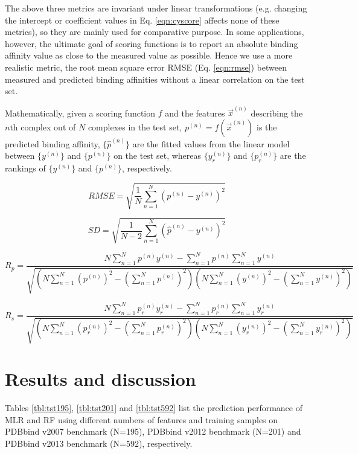 \documentclass[journal=jacsat,manuscript=article]{achemso}
\begin{document}
The above three metrics are invariant under linear transformations (e.g. changing the intercept or coefficient values in Eq. \ref{eqn:cyscore} affects none of these metrics), so they are mainly used for comparative purpose. In some applications, however, the ultimate goal of scoring functions is to report an absolute binding affinity value as close to the measured value as possible. Hence we use a more realistic metric, the root mean square error RMSE (Eq. \ref{eqn:rmse}) between measured and predicted binding affinities without a linear correlation on the test set.

Mathematically, given a scoring function $f$ and the features $\overrightarrow{x}^{(n)}$ describing the $n$th complex out of $N$ complexes in the test set, $p^{(n)}=f(\overrightarrow{x}^{(n)})$ is the predicted binding affinity, $\{\hat{p}^{(n)}\}$ are the fitted values from the linear model between $\{y^{(n)}\}$ and $\{p^{(n)}\}$ on the test set, whereas $\{y_r^{(n)}\}$ and $\{p_r^{(n)}\}$ are the rankings of $\{y^{(n)}\}$ and $\{p^{(n)}\}$, respectively. 

\begin{equation}
RMSE = \sqrt{\frac{1}{N}\sum_{n=1}^N(p^{(n)}-y^{(n)})^2}
\label{eqn:rmse}
\end{equation}

\begin{equation}
SD = \sqrt{\frac{1}{N-2}\sum_{n=1}^N(\hat{p}^{(n)}-y^{(n)})^2}
\label{eqn:sd}
\end{equation}

\begin{equation}
R_p = \frac{N\sum_{n=1}^Np^{(n)}y^{(n)}-\sum_{n=1}^Np^{(n)}\sum_{n=1}^Ny^{(n)}}{\sqrt{(N\sum_{n=1}^N(p^{(n)})^2-(\sum_{n=1}^Np^{(n)})^2)(N\sum_{n=1}^N(y^{(n)})^2-(\sum_{n=1}^Ny^{(n)})^2)}}
\label{eqn:rp}
\end{equation}

\begin{equation}
R_s = \frac{N\sum_{n=1}^Np_r^{(n)}y_r^{(n)}-\sum_{n=1}^Np_r^{(n)}\sum_{n=1}^Ny_r^{(n)}}{\sqrt{(N\sum_{n=1}^N(p_r^{(n)})^2-(\sum_{n=1}^Np_r^{(n)})^2)(N\sum_{n=1}^N(y_r^{(n)})^2-(\sum_{n=1}^Ny_r^{(n)})^2)}}
\label{eqn:rs}
\end{equation}

\section{Results and discussion}

Tables \ref{tbl:tst195}, \ref{tbl:tst201} and \ref{tbl:tst592} list the prediction performance of MLR and RF using different numbers of features and training samples on PDBbind v2007 benchmark (N=195), PDBbind v2012 benchmark (N=201) and PDBbind v2013 benchmark (N=592), respectively.
\end{document}
